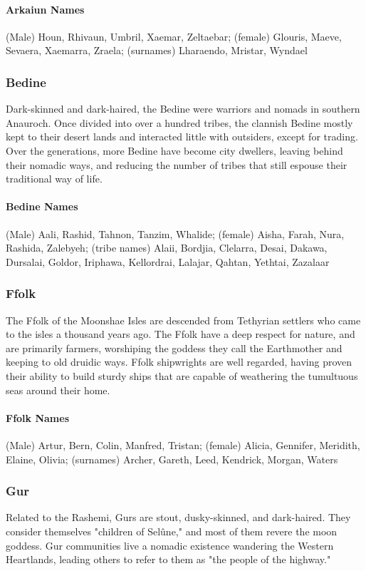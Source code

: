 \documentclass[10pt,a4paper,twoside,twocolumn,openany,bg=print,nodeprecatedcode]{dndbook}
\begin{document}
\paragraph{Arkaiun Names}
(Male) Houn, Rhivaun, Umbril, Xaemar, Zeltaebar; (female) Glouris, Maeve, Sevaera, Xaemarra, Zraela; (surnames) Lharaendo, Mristar, Wyndael
\subsubsection{Bedine}
Dark-skinned and dark-haired, the Bedine were warriors and nomads in southern Anauroch. Once divided into over a hundred tribes, the clannish Bedine mostly kept to their desert lands and interacted little with outsiders, except for trading. Over the generations, more Bedine have become city dwellers, leaving behind their nomadic ways, and reducing the number of tribes that still espouse their traditional way of life.
\paragraph{Bedine Names}
(Male) Aali, Rashid, Tahnon, Tanzim, Whalide; (female) Aisha, Farah, Nura, Rashida, Zalebyeh; (tribe names) Alaii, Bordjia, Clelarra, Desai, Dakawa, Dursalai, Goldor, Iriphawa, Kellordrai, Lalajar, Qahtan, Yethtai, Zazalaar
\subsubsection{Ffolk}
The Ffolk of the Moonshae Isles are descended from Tethyrian settlers who came to the isles a thousand years ago. The Ffolk have a deep respect for nature, and are primarily farmers, worshiping the goddess they call the Earthmother and keeping to old druidic ways. Ffolk shipwrights are well regarded, having proven their ability to build sturdy ships that are capable of weathering the tumultuous seas around their home.
\paragraph{Ffolk Names}
(Male) Artur, Bern, Colin, Manfred, Tristan; (female) Alicia, Gennifer, Meridith, Elaine, Olivia; (surnames) Archer, Gareth, Leed, Kendrick, Morgan, Waters
\subsubsection{Gur}
Related to the Rashemi, Gurs are stout, dusky-skinned, and dark-haired. They consider themselves "children of Selûne," and most of them revere the moon goddess. Gur communities live a nomadic existence wandering the Western Heartlands, leading others to refer to them as "the people of the highway."
\end{document}
